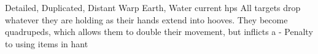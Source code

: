   {Detailed, Duplicated, Distant}%
  {Warp}%
  {Earth, Water}%
  {current \glspl{hp}}%
  {All  targets drop whatever they are holding as their hands extend into hooves.
  They become quadrupeds, which allows them to double their movement, but inflicts a - Penalty to using items in hant}%
  {}

